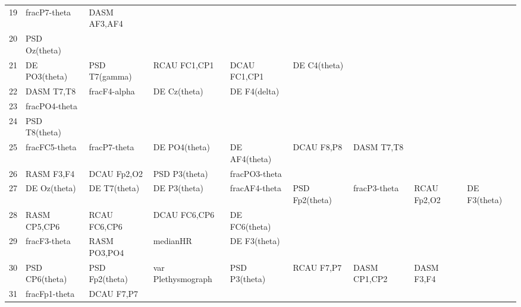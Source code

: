 \begin{landscape}
\begin{table}[]
\begin{tabular}{l|llllllll}
19                 & fracP7-theta         & DASM AF3,AF4            &                      &                    &                       &                      &                 &                 \\
20                 & PSD Oz(theta)        &                         &                      &                    &                       &                      &                 &                 \\
21                 & DE PO3(theta)        & PSD T7(gamma)           & RCAU FC1,CP1         & DCAU FC1,CP1       & DE C4(theta)          &                      &                 &                 \\
22                 & DASM T7,T8           & fracF4-alpha            & DE Cz(theta)         & DE F4(delta)       &                       &                      &                 &                 \\
23                 & fracPO4-theta        &                         &                      &                    &                       &                      &                 &                 \\
24                 & PSD T8(theta)        &                         &                      &                    &                       &                      &                 &                 \\
25                 & fracFC5-theta        & fracP7-theta            & DE PO4(theta)        & DE AF4(theta)      & DCAU F8,P8            & DASM T7,T8           &                 &                 \\
26                 & RASM F3,F4           & DCAU Fp2,O2             & PSD P3(theta)        & fracPO3-theta      &                       &                      &                 &                 \\
27                 & DE Oz(theta)         & DE T7(theta)            & DE P3(theta)         & fracAF4-theta      & PSD Fp2(theta)        & fracP3-theta         & RCAU Fp2,O2     & DE F3(theta)    \\
28                 & RASM CP5,CP6         & RCAU FC6,CP6            & DCAU FC6,CP6         & DE FC6(theta)      &                       &                      &                 &                 \\
29                 & fracF3-theta         & RASM PO3,PO4            & medianHR             & DE F3(theta)       &                       &                      &                 &                 \\
30                 & PSD CP6(theta)       & PSD Fp2(theta)          & var Plethysmograph   & PSD P3(theta)      & RCAU F7,P7            & DASM CP1,CP2         & DASM F3,F4      &                 \\
31                 & fracFp1-theta        & DCAU F7,P7              &                      &                    &                       &                      &                 &                 \\
\end{tabular}
\end{table}
\end{landscape}

